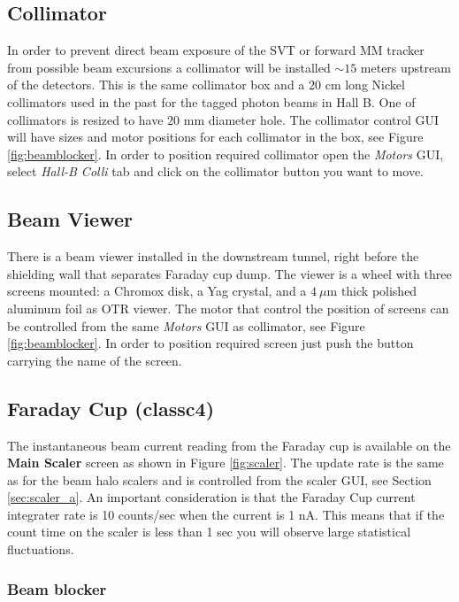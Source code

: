 \documentclass[12pt]{article}
\begin{document}
\subsection{Collimator \label{sec:colim}}
\indent

In order to prevent direct beam exposure of the SVT or forward MM tracker from possible beam excursions a collimator will be installed $\sim 15$ meters upstream of the detectors. This is the same collimator box and a $20$ cm long Nickel collimators used in the past for the tagged photon beams in Hall B. One of collimators is resized to have $20$ mm diameter hole. The collimator control GUI will have sizes and motor positions for each collimator in the box, see Figure \ref{fig:beamblocker}. In order to position required collimator open the {\it Motors} GUI, select {\it Hall-B Colli} tab and click on the collimator button you want to move.   

\subsection{Beam Viewer \label{sec:view}}
\indent

There is a beam viewer installed in the downstream tunnel, right before the shielding wall that separates Faraday cup dump. The viewer is a wheel with three screens mounted: a Chromox disk, a Yag crystal, and a $4~\mu$m thick polished aluminum foil as OTR viewer. The motor that control the position of screens can be controlled from the same {\it Motors} GUI as collimator, see Figure \ref{fig:beamblocker}. In order to position required screen just push the button carrying the name of the screen.  

\subsection{Faraday Cup (classc4) \label{sec:fcup}}
\indent

The instantaneous beam current reading from the Faraday cup is available on
the \textbf{Main Scaler} screen as shown in Figure \ref{fig:scaler}. The update rate is the same as for the beam halo scalers and
is controlled from the scaler GUI, see Section \ref{sec:scaler_a}. An important consideration
is that the Faraday Cup current integrater rate is 10 counts/sec when the current
is 1 nA. This means that if the count time on the scaler is less than 1 sec
you will observe large statistical fluctuations.


\subsubsection{Beam blocker}
\indent
\end{document}
